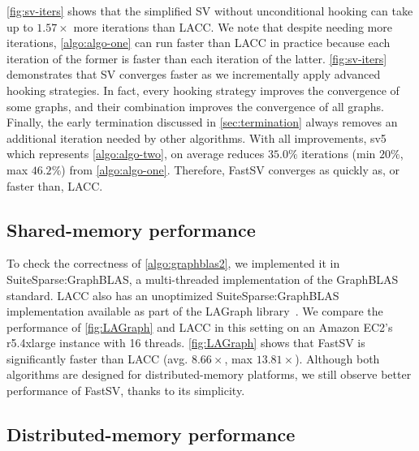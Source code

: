 \documentclass{sokendai_thesis} %
\newcommand{\Name}[0]{FastSV} %
\begin{document}
\autoref{fig:sv-iters} shows that the simplified SV without unconditional hooking can take up to $1.57\times$ more iterations than LACC. 
We note that despite needing more iterations, \autoref{algo:algo-one} can run faster than LACC in practice because each iteration of the former is faster than each iteration of the latter.
\autoref{fig:sv-iters} demonstrates that SV converges faster as we incrementally apply advanced hooking strategies.
In fact, every hooking strategy improves the convergence of some graphs, and their combination improves the convergence of all graphs. 
Finally, the early termination discussed in \autoref{sec:termination} always removes an additional iteration needed by other algorithms. 
With all improvements, sv5 which represents \autoref{algo:algo-two}, on average reduces $35.0\%$ iterations (min $20\%$, max $46.2\%$) from \autoref{algo:algo-one}.
Therefore,  \Name{} converges as quickly as, or faster than, LACC.

\subsection{Shared-memory performance}

To check the correctness of \autoref{algo:graphblas2}, we implemented it in SuiteSparse:GraphBLAS, a multi-threaded implementation of the GraphBLAS standard.
LACC also has an unoptimized SuiteSparse:GraphBLAS implementation available as part of the LAGraph library~\cite{lagraph}.
We compare the performance of \autoref{fig:LAGraph} and LACC in this setting on an Amazon EC2's r5.4xlarge instance with 16 threads.
\autoref{fig:LAGraph} shows that \Name{} is significantly faster than LACC (avg. $8.66\times$, max $13.81\times$).
Although both algorithms are designed for distributed-memory platforms, we still observe better performance of \Name{}, thanks to its simplicity.

\subsection{Distributed-memory performance}
\end{document}
